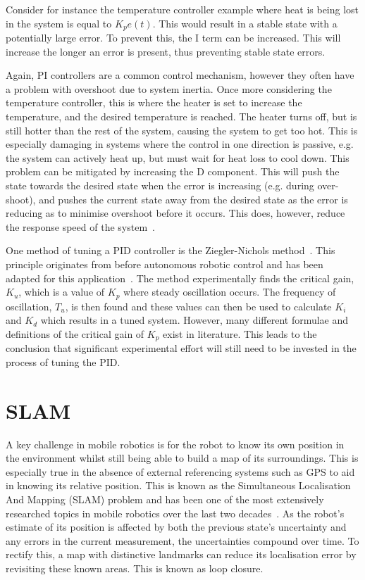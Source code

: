 Consider for instance the temperature controller example where heat is being
lost in the system is equal to $K_{p}e(t)$. This would
result in a stable state with a potentially large error. To prevent this,
the I term can be increased. This will increase the longer an error is
present, thus preventing stable state errors.

Again, PI controllers are a common control mechanism, however they often have
a problem with overshoot due to system inertia. Once more considering the
temperature controller, this is where the heater is set to increase the
temperature, and the desired temperature is reached. The heater turns off, but
is still hotter than the rest of the system, causing the system to get too hot.
This is especially damaging in systems where the control in one direction
is passive, e.g. the system can actively heat up, but must wait for heat loss
to cool down. This problem can be mitigated by increasing the D component.
This will push the state towards the desired state when the error is increasing
(e.g. during over-shoot), and pushes the current state away from the desired
state as the error is reducing as to minimise overshoot before it
occurs. This does, however, reduce the response speed of the system~\cite{chen2007linear}.

One method of tuning a PID controller is the Ziegler-Nichols method~\cite{ziegler1942optimum}. This principle originates from before autonomous
robotic control and has been adapted for this application~\cite{aastrom2004revisiting}. The method experimentally finds the critical gain, $K_u$, which is a value of $K_p$
where steady oscillation occurs. The frequency of oscillation, $T_u$, is then found and
these values can then be used to calculate $K_i$ and $K_d$ which results in a
tuned system. However, many different formulae and definitions of the critical
gain of $K_p$ exist in literature. This leads to the conclusion that significant experimental effort will still need to be invested in the process of tuning the PID.

\section{SLAM}\label{litreview/slam}
A key challenge in mobile robotics is for the robot to know its own position in the
environment whilst still being able to build a map of its surroundings.
This is especially true in the absence of external referencing systems
such as GPS to aid in knowing its relative position. This is known as the Simultaneous Localisation And Mapping (SLAM)
problem and has been one of the most extensively researched topics in mobile
robotics over the last two decades~\cite{grisetti2010tutorial}. As the robot's
estimate of its position is affected by both the previous state's uncertainty
and any errors in the current measurement, the uncertainties compound
over time. To rectify this, a map with distinctive landmarks can reduce its
localisation error by revisiting these known areas. This is known as loop closure.

